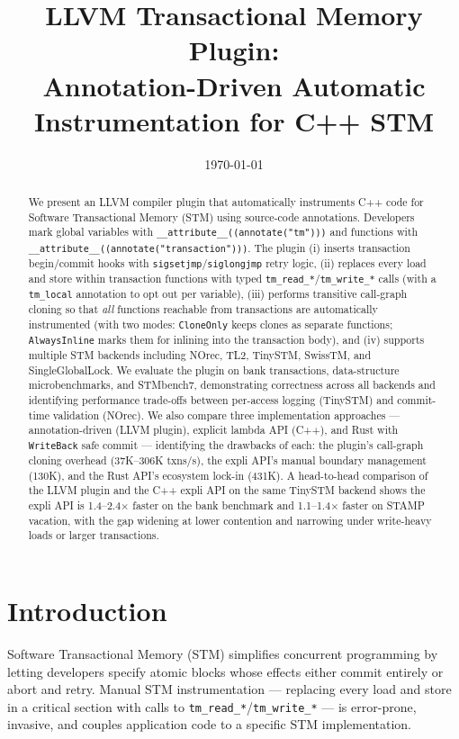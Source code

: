 \documentclass[article,12pt]{article}
\title{LLVM Transactional Memory Plugin:\\Annotation-Driven Automatic Instrumentation for C++ STM}
\author{}
\date{\today}
\begin{document}
\maketitle

\begin{abstract}
We present an LLVM compiler plugin that automatically instruments C++ code for Software
Transactional Memory (STM) using source-code annotations.  Developers mark global variables
with \texttt{\_\_attribute\_\_((annotate("tm")))} and functions with
\texttt{\_\_attribute\_\_((annotate("transaction")))}.  The plugin (i) inserts
transaction begin/commit hooks with \texttt{sigsetjmp}/\texttt{siglongjmp} retry logic,
(ii) replaces every load and store within transaction functions with typed \texttt{tm\_read\_*}/\texttt{tm\_write\_*}
calls (with a \texttt{tm\_local} annotation to opt out per variable), (iii) performs transitive call-graph cloning so that \emph{all} functions reachable from
transactions are automatically instrumented (with two modes: \texttt{CloneOnly} keeps
clones as separate functions; \texttt{AlwaysInline} marks them for inlining into the
transaction body), and
(iv) supports multiple STM backends
including NOrec, TL2, TinySTM, SwissTM, and SingleGlobalLock.  We evaluate the plugin
on bank transactions, data-structure microbenchmarks, and STMbench7, demonstrating
correctness across all backends and identifying performance trade-offs between
per-access logging (TinySTM) and commit-time validation (NOrec).  We also compare
three implementation approaches --- annotation-driven (LLVM plugin), explicit
lambda API (C++), and Rust with \texttt{WriteBack} safe commit --- identifying
the drawbacks of each: the plugin's call-graph cloning overhead (37K--306K
txns/s), the expli API's manual boundary management (130K), and the Rust API's
ecosystem lock-in (431K).  A head-to-head comparison of the LLVM plugin and the
C++ expli API on the same TinySTM backend shows the expli API is 1.4--2.4$\times$
faster on the bank benchmark and 1.1--1.4$\times$ faster on STAMP vacation,
with the gap widening at lower contention and narrowing under write-heavy
loads or larger transactions.
\end{abstract}

\section{Introduction}

Software Transactional Memory (STM) simplifies concurrent programming by letting developers
specify atomic blocks whose effects either commit entirely or abort and retry.  Manual STM
instrumentation --- replacing every load and store in a critical section with calls to
\texttt{tm\_read\_*}/\texttt{tm\_write\_*} --- is error-prone, invasive, and couples application
code to a specific STM implementation.
\end{document}
